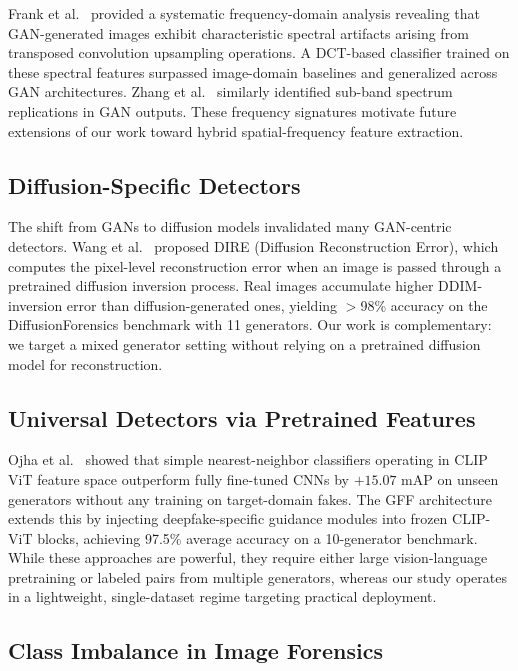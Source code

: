 \documentclass[10pt,twocolumn]{article}
\begin{document}
Frank et al.~\cite{frank2020frequency} provided a systematic frequency-domain
analysis revealing that GAN-generated images exhibit characteristic spectral
artifacts arising from transposed convolution upsampling operations.
A DCT-based classifier trained on these spectral features surpassed
image-domain baselines and generalized across GAN architectures.
Zhang et al.~\cite{zhang2019detecting} similarly identified sub-band spectrum
replications in GAN outputs. These frequency signatures motivate future
extensions of our work toward hybrid spatial-frequency feature extraction.

\subsection{Diffusion-Specific Detectors}

The shift from GANs to diffusion models invalidated many GAN-centric detectors.
Wang et al.~\cite{wang2023dire} proposed DIRE (Diffusion Reconstruction Error),
which computes the pixel-level reconstruction error when an image is passed
through a pretrained diffusion inversion process. Real images accumulate higher
DDIM-inversion error than diffusion-generated ones, yielding $>$98\% accuracy
on the DiffusionForensics benchmark with 11 generators.
Our work is complementary: we target a mixed generator setting without
relying on a pretrained diffusion model for reconstruction.

\subsection{Universal Detectors via Pretrained Features}

Ojha et al.~\cite{ojha2023unifd} showed that simple nearest-neighbor classifiers
operating in CLIP ViT feature space outperform fully fine-tuned CNNs by
$+15.07$ mAP on unseen generators without any training on target-domain fakes.
The GFF architecture~\cite{guo2024gff} extends this by injecting deepfake-specific
guidance modules into frozen CLIP-ViT blocks, achieving 97.5\% average accuracy
on a 10-generator benchmark.
While these approaches are powerful, they require either large vision-language
pretraining or labeled pairs from multiple generators, whereas our study
operates in a lightweight, single-dataset regime targeting practical deployment.

\subsection{Class Imbalance in Image Forensics}
\end{document}
